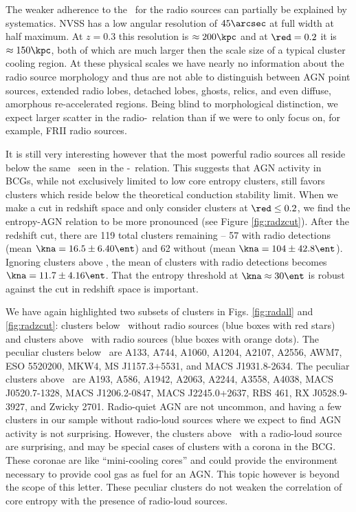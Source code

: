 \documentclass{emulateapj}
\begin{document}
The weaker adherence to the \kthr\ for the radio
sources can partially be explained by systematics. NVSS has a low
angular resolution of $45\arcsec$ at full width at half maximum. At
$z = 0.3$ this resolution is $\approx 200\kpc$ and at $\red = 0.2$ it
is $\approx 150\kpc$, both of which are much larger then the scale
size of a typical cluster cooling region. At these physical scales we
have nearly no information about the radio source morphology and thus
are not able to distinguish between AGN point sources, extended radio
lobes, detached lobes, ghosts, relics, and even diffuse, amorphous
re-accelerated regions. Being blind to morphological distinction, we
expect larger scatter in the radio-\kna\ relation than if we were to
only focus on, for example, FRII radio sources.

It is still very interesting however that the most powerful radio
sources all reside below the same \kthr\ seen in the \kna-\halpha\
relation. This suggests that AGN activity in BCGs, while not
exclusively limited to low core entropy clusters, still favors
clusters which reside below the theoretical conduction stability
limit. When we make a cut in redshift space and only consider clusters
at $\red \leq 0.2$, we find the entropy-AGN relation to be more
pronounced (see Figure \ref{fig:radzcut}). After the redshift cut,
there are 119 total clusters remaining -- 57 with radio detections
(mean $\kna = 16.5 \pm 6.40 \ent$) and 62 without (mean $\kna =
104 \pm 42.8 \ent$). Ignoring clusters above \kthr, the mean of
clusters with radio detections becomes $\kna = 11.7 \pm 4.16
\ent$. That the entropy threshold at $\kna \approx 30 \ent$ is robust
against the cut in redshift space is important.

We have again highlighted two subsets of clusters in
Figs. \ref{fig:radall} and \ref{fig:radzcut}: clusters below \kthr\
without radio sources (blue boxes with red stars) and clusters above
\kthr\ with radio sources (blue boxes with orange dots). The peculiar
clusters below \kthr\ are A133, A744, A1060, A1204, A2107, A2556,
AWM7, ESO 5520200, MKW4, MS J1157.3+5531, and MACS J1931.8-2634. The
peculiar clusters above \kthr\ are A193, A586, A1942, A2063, A2244,
A3558, A4038, MACS J0520.7-1328, MACS J1206.2-0847, MACS J2245.0+2637,
RBS 461, RX J0528.9-3927, and Zwicky 2701. Radio-quiet AGN are not
uncommon, and having a few clusters in our sample without radio-loud
sources where we expect to find AGN activity is not
surprising. However, the clusters above \kthr\ with a radio-loud
source are surprising, and may be special cases of clusters with a
corona in the BCG. These coronae are like ``mini-cooling cores'' and
could provide the environment necessary to provide cool gas as fuel
for an AGN. This topic however is beyond the scope of this
letter. These peculiar clusters do not weaken the correlation of core
entropy with the presence of radio-loud sources.
\end{document}
